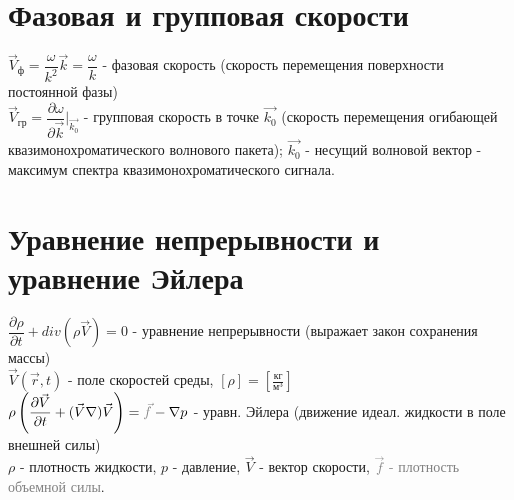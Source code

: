 \begin{multicols*}{2}
		\section{Фазовая и групповая скорости}
		$\vec{V}_\text{ф} = \dfrac{\omega}{k^2} \vec{k} = \dfrac{\omega}{k}$ - фазовая скорость (скорость перемещения поверхности постоянной фазы)\\
		$\vec{V}_\text{гр} = \dfrac{\partial\omega}{\partial \vec{k}}\bigg|_{\vec{k_0}}$ - групповая скорость в точке $\vec{k_0}$ (скорость перемещения огибающей квазимонохроматического волнового пакета); $\vec{k_0}$ - несущий волновой вектор - максимум спектра квазимонохроматического сигнала.

		\section{Уравнение непрерывности и уравнение Эйлера}
		$\dfrac{\partial \rho}{\partial t} + div (\rho \vec{V}) = 0$ - уравнение непрерывности (выражает закон сохранения массы)\\
		$\vec{V} (\vec{r}, t)$ - поле скоростей среды, $\left[\rho\right] = \left[\frac{\text{кг}}{\text{м}^3}\right]$\\
		$\rho \left(\dfrac{\partial \vec{V}}{\partial t} +  (\vec{V} \nabla)  \vec{V}\right)  = \textcolor{gray}{ \vec{f}} - \nabla p$  - уравн. Эйлера (движение идеал. жидкости в поле внешней силы)\\
		$\rho$ - плотность жидкости, $p$ - давление, $ \vec{V}$ - вектор скорости,  \textcolor{gray}{$\vec{f}$ - плотность объемной силы}.


\end{multicols*}
